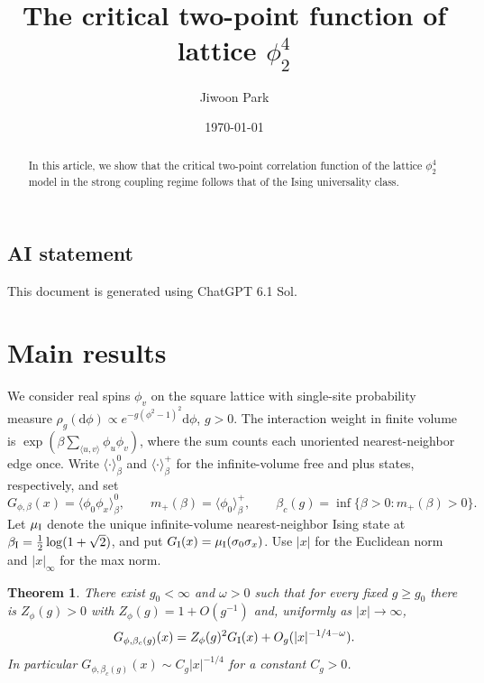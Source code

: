 \documentclass[11pt]{article}
\title{The critical two-point function of lattice $\phi^4_2$}
\author{Jiwoon Park}
\date{\today}
\newtheorem{theorem}{Theorem}
\theoremstyle{definition}
\begin{document}
\maketitle

\begin{abstract}
In this article, we show that the critical two-point correlation function of the lattice $\phi^4_2$ model in the strong coupling regime
follows that of the Ising universality class.
\end{abstract}

\subsection*{AI statement}

This document is generated using ChatGPT 6.1 Sol.

\section{Main results}

We consider real spins \(\phi_v\) on the square lattice with single-site
probability measure \(\rho_g(\mathrm d\phi)\propto
e^{-g(\phi^2-1)^2}\mathrm d\phi\), \(g>0\). The interaction weight
in finite volume is \(\exp(\beta\sum_{\langle u,v\rangle}\phi_u\phi_v)\),
where the sum counts each unoriented nearest-neighbor edge once.
Write \(\langle\cdot\rangle_\beta^0\) and
\(\langle\cdot\rangle_\beta^+\) for the infinite-volume free and plus
states, respectively, and set
\[
 G_{\phi,\beta}(x)=\langle\phi_0\phi_x\rangle_\beta^0,\qquad
 m_+(\beta)=\langle\phi_0\rangle_\beta^+,\qquad
 \beta_c(g)=\inf\{\beta>0:m_+(\beta)>0\}.
\]
Let \(\mu_{\rm I}\) denote the unique infinite-volume nearest-neighbor Ising
state at \(\beta_{\rm I}=\tfrac12\log(1+\sqrt2)\), and put
\(G_{\rm I}(x)=\mu_{\rm I}(\sigma_0\sigma_x)\).
Use \(|x|\) for the Euclidean norm and \(|x|_\infty\) for the max norm.

\begin{theorem}\label{thm:main}
There exist \(g_0<\infty\) and \(\omega>0\) such that for every fixed
\(g\ge g_0\) there is \(Z_\phi(g)>0\) with \(Z_\phi(g)=1+O(g^{-1})\)
and, uniformly as \(|x|\to\infty\),
\begin{equation}
 G_{\phi,\beta_c(g)}(x)
   = Z_\phi(g)^2G_{\rm I}(x)+O_g(|x|^{-1/4-\omega}).
 \label{eq:direct-bulk-phi-two}
\end{equation}
In particular \(G_{\phi,\beta_c(g)}(x)\sim C_g |x|^{-1/4}\) for a
constant \(C_g>0\).
\end{theorem}
\end{document}
